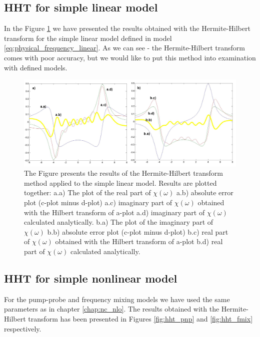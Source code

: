 \documentclass[12pt,twoside,a4paper]{article}
\numberwithin{equation}{subsection}
\numberwithin{figure}{subsection}
\begin{document}
\subsection{HHT for simple linear model} \label{chap:hermite_lin}

In the Figure \ref{fig:hht_lin} we have presented the results obtained with the Hermite-Hilbert transform for the simple
linear model defined in model \ref{eq:physical_frequency_linear}. As we can see - the Hermite-Hilbert transform comes with poor accuracy, but we
would like to put this method into examination with defined models.

\begin{figure} 
  \includegraphics[width=150mm]{img/hht_lin.png}
  \caption{ The Figure presents the results of the Hermite-Hilbert transform method applied to the simple linear model. Results are
  plotted together: 
   a.a) The plot of the real part of $\chi (\omega )$ 
   a.b) absolute error plot (c-plot minus d-plot) 
   a.c) imaginary part of $\chi (\omega )$ obtained with the Hilbert transform of a-plot 
   a.d) imaginary part of $\chi (\omega )$  calculated analytically. 
   b.a) The plot of the imaginary part of $\chi (\omega )$ 
   b.b) absolute error plot (c-plot minus d-plot) 
   b.c) real part of $\chi (\omega )$ obtained with the Hilbert transform of a-plot 
   b.d) real part of $\chi (\omega )$ calculated analytically. \label{fig:hht_lin}
  }
\end{figure}

\subsection{HHT for simple nonlinear model} \label{chap:hermite_nlo}

For the pump-probe and frequency mixing models we have used the same parameters as in chapter \ref{chap:nc_nlo}. The results
obtained with the Hermite-Hilbert transform has been presented in Figures \ref{fig:hht_pnp} and \ref{fig:hht_fmix}
respectively.
\end{document}
